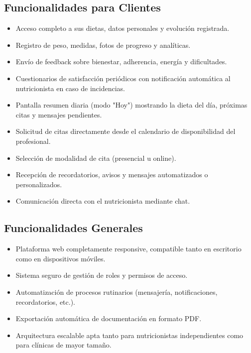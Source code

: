 \subsection{Funcionalidades para Clientes}

\begin{itemize}
  \item Acceso completo a sus dietas, datos personales y evolución registrada.
  \item Registro de peso, medidas, fotos de progreso y analíticas.
  \item Envío de feedback sobre bienestar, adherencia, energía y dificultades.
  \item Cuestionarios de satisfacción periódicos con notificación automática al nutricionista en caso de incidencias.
  \item Pantalla resumen diaria (modo "Hoy") mostrando la dieta del día, próximas citas y mensajes pendientes.
  \item Solicitud de citas directamente desde el calendario de disponibilidad del profesional.
  \item Selección de modalidad de cita (presencial u online).
  \item Recepción de recordatorios, avisos y mensajes automatizados o personalizados.
  \item Comunicación directa con el nutricionista mediante chat.
\end{itemize}

\subsection{Funcionalidades Generales}

\begin{itemize}
  \item Plataforma web completamente responsive, compatible tanto en escritorio como en dispositivos móviles.
  \item Sistema seguro de gestión de roles y permisos de acceso.
  \item Automatización de procesos rutinarios (mensajería, notificaciones, recordatorios, etc.).
  \item Exportación automática de documentación en formato PDF.
  \item Arquitectura escalable apta tanto para nutricionistas independientes como para clínicas de mayor tamaño.
\end{itemize}
